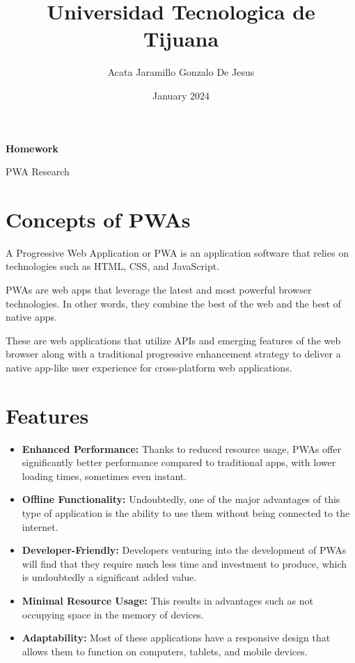 \documentclass{report}
\title{Universidad Tecnologica de Tijuana}
\author{Acata Jaramillo Gonzalo De Jesus}
\date{January 2024}
\begin{document}
\maketitle

\begin{center}
    \textbf{Homework}
\end{center}

\begin{center}
    PWA Research
\end{center}

\section{Concepts of PWAs}

A Progressive Web Application or PWA is an application software that relies on technologies such as HTML, CSS, and JavaScript.

PWAs are web apps that leverage the latest and most powerful browser technologies. In other words, they combine the best of the web and the best of native apps.

These are web applications that utilize APIs and emerging features of the web browser along with a traditional progressive enhancement strategy to deliver a native app-like user experience for cross-platform web applications.

\section{Features}

\begin{itemize}
\item \textbf{Enhanced Performance:} Thanks to reduced resource usage, PWAs offer significantly better performance compared to traditional apps, with lower loading times, sometimes even instant.
\item \textbf{Offline Functionality:} Undoubtedly, one of the major advantages of this type of application is the ability to use them without being connected to the internet.
\item \textbf{Developer-Friendly:} Developers venturing into the development of PWAs will find that they require much less time and investment to produce, which is undoubtedly a significant added value.
\item \textbf{Minimal Resource Usage:} This results in advantages such as not occupying space in the memory of devices.
\item \textbf{Adaptability:} Most of these applications have a responsive design that allows them to function on computers, tablets, and mobile devices.
\end{itemize}
\end{document}
